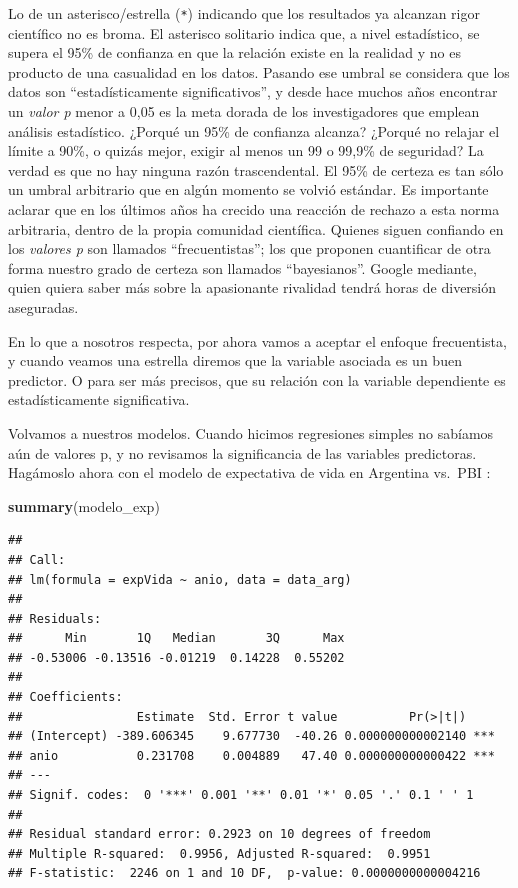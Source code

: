 \documentclass[spanish,]{book}
\newenvironment{Shaded}{\begin{snugshade}}{\end{snugshade}}
\newcommand{\KeywordTok}[1]{\textcolor[rgb]{0.13,0.29,0.53}{\textbf{#1}}}
\newcommand{\NormalTok}[1]{#1}
\begin{document}
Lo de un asterisco/estrella (\texttt{*}) indicando que los resultados ya alcanzan rigor científico no es broma. El asterisco solitario indica que, a nivel estadístico, se supera el 95\% de confianza en que la relación existe en la realidad y no es producto de una casualidad en los datos. Pasando ese umbral se considera que los datos son ``estadísticamente significativos'', y desde hace muchos años encontrar un \emph{valor p} menor a 0,05 es la meta dorada de los investigadores que emplean análisis estadístico. ¿Porqué un 95\% de confianza alcanza? ¿Porqué no relajar el límite a 90\%, o quizás mejor, exigir al menos un 99 o 99,9\% de seguridad? La verdad es que no hay ninguna razón trascendental. El 95\% de certeza es tan sólo un umbral arbitrario que en algún momento se volvió estándar. Es importante aclarar que en los últimos años ha crecido una reacción de rechazo a esta norma arbitraria, dentro de la propia comunidad científica. Quienes siguen confiando en los \emph{valores p} son llamados ``frecuentistas''; los que proponen cuantificar de otra forma nuestro grado de certeza son llamados ``bayesianos''. Google mediante, quien quiera saber más sobre la apasionante rivalidad tendrá horas de diversión aseguradas.

En lo que a nosotros respecta, por ahora vamos a aceptar el enfoque frecuentista, y cuando veamos una estrella diremos que la variable asociada es un buen predictor. O para ser más precisos, que su relación con la variable dependiente es estadísticamente significativa.

Volvamos a nuestros modelos. Cuando hicimos regresiones simples no sabíamos aún de valores p, y no revisamos la significancia de las variables predictoras. Hagámoslo ahora con el modelo de expectativa de vida en Argentina vs.~PBI :

\begin{Shaded}
\begin{Highlighting}[]
\KeywordTok{summary}\NormalTok{(modelo_exp)}
\end{Highlighting}
\end{Shaded}

\begin{verbatim}
## 
## Call:
## lm(formula = expVida ~ anio, data = data_arg)
## 
## Residuals:
##      Min       1Q   Median       3Q      Max 
## -0.53006 -0.13516 -0.01219  0.14228  0.55202 
## 
## Coefficients:
##                Estimate  Std. Error t value          Pr(>|t|)    
## (Intercept) -389.606345    9.677730  -40.26 0.000000000002140 ***
## anio           0.231708    0.004889   47.40 0.000000000000422 ***
## ---
## Signif. codes:  0 '***' 0.001 '**' 0.01 '*' 0.05 '.' 0.1 ' ' 1
## 
## Residual standard error: 0.2923 on 10 degrees of freedom
## Multiple R-squared:  0.9956, Adjusted R-squared:  0.9951 
## F-statistic:  2246 on 1 and 10 DF,  p-value: 0.0000000000004216
\end{verbatim}
\end{document}
